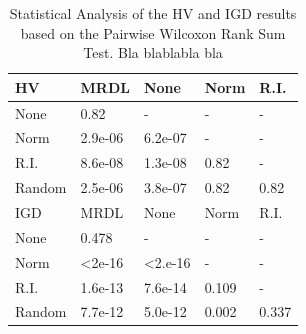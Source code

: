 \begin{table}[]
\begin{tabular}{lllll}
\hline
\multicolumn{1}{|l|}{HV}  & \multicolumn{1}{l}{MRDL} & \multicolumn{1}{l}{None} & \multicolumn{1}{l}{Norm} & \multicolumn{1}{l|}{R.I.} \\ \hline
None                      & 0.82                      & -                         & -                         & -                         \\
Norm                      & 2.9e-06                   & 6.2e-07                   & -                         & -                         \\
R.I.                      & 8.6e-08                   & 1.3e-08                   & 0.82                      & -                         \\
Random                    & 2.5e-06                   & 3.8e-07                   & 0.82                      & 0.82                      \\ \hline
\multicolumn{1}{|l|}{IGD} & \multicolumn{1}{l}{MRDL} & \multicolumn{1}{l}{None} & \multicolumn{1}{l}{Norm} & \multicolumn{1}{l|}{R.I.} \\ \hline
None                      & 0.478                     & -                         & -                         & -                         \\
Norm                      & \textless 2e-16           & \textless 2.e-16          & -                         & -                         \\
R.I.                      & 1.6e-13                   & 7.6e-14                   & 0.109                     & -                         \\
Random                    & 7.7e-12                   & 5.0e-12                   & 0.002                     & 0.337
\end{tabular}
\caption{Statistical Analysis of the HV and IGD results based on the Pairwise Wilcoxon Rank Sum Test. Bla blablabla bla}
\label{statistics}
\end{table}


